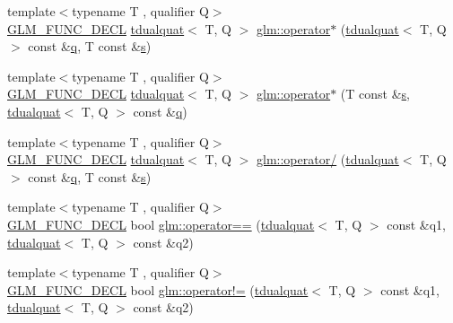 \begin{DoxyCompactItemize}
\item 
{\footnotesize template$<$typename T , qualifier Q$>$ }\\\mbox{\hyperlink{setup_8hpp_ab2d052de21a70539923e9bcbf6e83a51}{G\+L\+M\+\_\+\+F\+U\+N\+C\+\_\+\+D\+E\+CL}} \mbox{\hyperlink{structglm_1_1tdualquat}{tdualquat}}$<$ T, Q $>$ \mbox{\hyperlink{group__gtx__dual__quaternion_ga03c35eae969f074f10fa2bf473670ad7}{glm\+::operator$\ast$}} (\mbox{\hyperlink{structglm_1_1tdualquat}{tdualquat}}$<$ T, Q $>$ const \&\mbox{\hyperlink{_s_d_l__opengl_8h_a8fc1e7b9baaae687804c7eed46ca09c6}{q}}, T const \&\mbox{\hyperlink{_s_d_l__opengl_8h_a4af680a6c683f88ed67b76f207f2e6e4}{s}})
\item 
{\footnotesize template$<$typename T , qualifier Q$>$ }\\\mbox{\hyperlink{setup_8hpp_ab2d052de21a70539923e9bcbf6e83a51}{G\+L\+M\+\_\+\+F\+U\+N\+C\+\_\+\+D\+E\+CL}} \mbox{\hyperlink{structglm_1_1tdualquat}{tdualquat}}$<$ T, Q $>$ \mbox{\hyperlink{group__gtx__dual__quaternion_gafbd543470cb70432624e046ab85a00e4}{glm\+::operator$\ast$}} (T const \&\mbox{\hyperlink{_s_d_l__opengl_8h_a4af680a6c683f88ed67b76f207f2e6e4}{s}}, \mbox{\hyperlink{structglm_1_1tdualquat}{tdualquat}}$<$ T, Q $>$ const \&\mbox{\hyperlink{_s_d_l__opengl_8h_a8fc1e7b9baaae687804c7eed46ca09c6}{q}})
\item 
{\footnotesize template$<$typename T , qualifier Q$>$ }\\\mbox{\hyperlink{setup_8hpp_ab2d052de21a70539923e9bcbf6e83a51}{G\+L\+M\+\_\+\+F\+U\+N\+C\+\_\+\+D\+E\+CL}} \mbox{\hyperlink{structglm_1_1tdualquat}{tdualquat}}$<$ T, Q $>$ \mbox{\hyperlink{group__gtx__dual__quaternion_gaac31fa68a57186cd22388eb385ca115d}{glm\+::operator/}} (\mbox{\hyperlink{structglm_1_1tdualquat}{tdualquat}}$<$ T, Q $>$ const \&\mbox{\hyperlink{_s_d_l__opengl_8h_a8fc1e7b9baaae687804c7eed46ca09c6}{q}}, T const \&\mbox{\hyperlink{_s_d_l__opengl_8h_a4af680a6c683f88ed67b76f207f2e6e4}{s}})
\item 
{\footnotesize template$<$typename T , qualifier Q$>$ }\\\mbox{\hyperlink{setup_8hpp_ab2d052de21a70539923e9bcbf6e83a51}{G\+L\+M\+\_\+\+F\+U\+N\+C\+\_\+\+D\+E\+CL}} bool \mbox{\hyperlink{group__gtx__dual__quaternion_ga82faf668287e9ca3c9751d873a85970d}{glm\+::operator==}} (\mbox{\hyperlink{structglm_1_1tdualquat}{tdualquat}}$<$ T, Q $>$ const \&q1, \mbox{\hyperlink{structglm_1_1tdualquat}{tdualquat}}$<$ T, Q $>$ const \&q2)
\item 
{\footnotesize template$<$typename T , qualifier Q$>$ }\\\mbox{\hyperlink{setup_8hpp_ab2d052de21a70539923e9bcbf6e83a51}{G\+L\+M\+\_\+\+F\+U\+N\+C\+\_\+\+D\+E\+CL}} bool \mbox{\hyperlink{group__gtx__dual__quaternion_ga41964adca31c6e6b52f1367104d15646}{glm\+::operator!=}} (\mbox{\hyperlink{structglm_1_1tdualquat}{tdualquat}}$<$ T, Q $>$ const \&q1, \mbox{\hyperlink{structglm_1_1tdualquat}{tdualquat}}$<$ T, Q $>$ const \&q2)

\end{DoxyCompactItemize}
